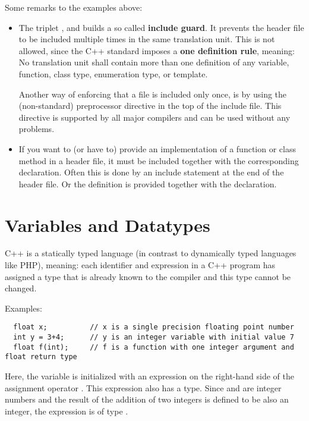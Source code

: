Some remarks to the examples above:
\begin{itemize}
  \item The triplet ,  and  builds a so called \textbf{include guard}. It prevents the header file to be included multiple times in the same translation unit. This is not allowed, since the C++ standard imposes a \textbf{one definition rule}, meaning: No translation unit shall contain more than one definition of any variable, function, class type, enumeration type, or template.

  Another way of enforcing that a file is included only once, is by using the (non-standard) preprocessor directive  in the top of the include file. This directive is supported by all major compilers and can be used without any problems.

  \item If you want to (or have to) provide an implementation of a function or class method in a header file, it must be included together with the corresponding declaration. Often this is done by an include statement at the end of the header file. Or the definition is provided together with the declaration.
\end{itemize}


\section{Variables and Datatypes\label{sec:data-type}}
C++ is a statically typed language (in contrast to dynamically typed languages like \eg PHP), meaning: each identifier and expression in a C++ program has assigned a type that is already known to the compiler and this type cannot be changed.

Examples:
\begin{verbatim}
  float x;          // x is a single precision floating point number
  int y = 3+4;      // y is an integer variable with initial value 7
  float f(int);     // f is a function with one integer argument and float return type
\end{verbatim}

Here, the variable  is initialized with an expression on the right-hand side of the assignment operator \cpp{=}. This expression  also has a type. Since  and  are integer numbers and the result of the addition of two integers is defined to be also an integer, the expression is of type .

